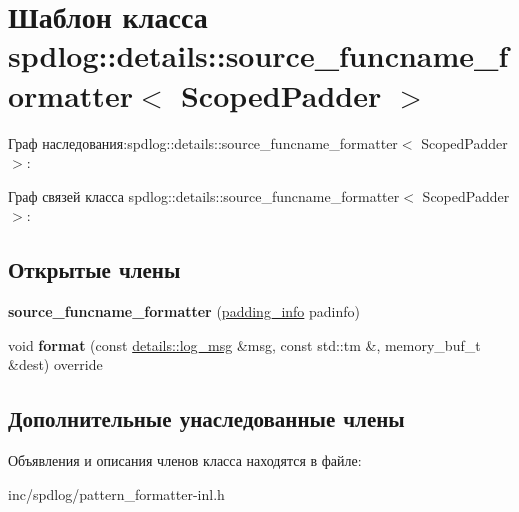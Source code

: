 \hypertarget{classspdlog_1_1details_1_1source__funcname__formatter}{}\section{Шаблон класса spdlog\+:\+:details\+:\+:source\+\_\+funcname\+\_\+formatter$<$ Scoped\+Padder $>$}
\label{classspdlog_1_1details_1_1source__funcname__formatter}


Граф наследования\+:spdlog\+:\+:details\+:\+:source\+\_\+funcname\+\_\+formatter$<$ Scoped\+Padder $>$\+:


Граф связей класса spdlog\+:\+:details\+:\+:source\+\_\+funcname\+\_\+formatter$<$ Scoped\+Padder $>$\+:
\subsection*{Открытые члены}
\begin{DoxyCompactItemize}
\item 
\mbox{\label{classspdlog_1_1details_1_1source__funcname__formatter_ac64b91e85233fb88a4dc67c47ed1b630}} 
{\bfseries source\+\_\+funcname\+\_\+formatter} (\hyperlink{structspdlog_1_1details_1_1padding__info}{padding\+\_\+info} padinfo)
\item 
\mbox{\label{classspdlog_1_1details_1_1source__funcname__formatter_a1f7af1a53b0efee121f726e9ebe260fc}} 
void {\bfseries format} (const \hyperlink{structspdlog_1_1details_1_1log__msg}{details\+::log\+\_\+msg} \&msg, const std\+::tm \&, memory\+\_\+buf\+\_\+t \&dest) override
\end{DoxyCompactItemize}
\subsection*{Дополнительные унаследованные члены}


Объявления и описания членов класса находятся в файле\+:\begin{DoxyCompactItemize}
\item 
inc/spdlog/pattern\+\_\+formatter-\/inl.\+h\end{DoxyCompactItemize}
